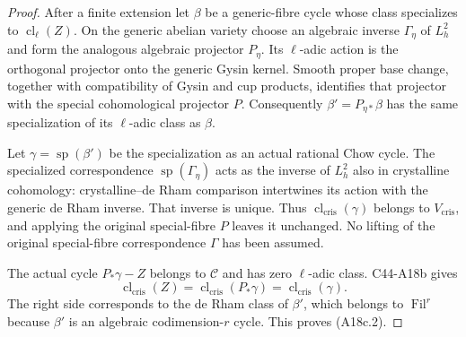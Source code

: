 \documentclass[11pt]{article}
\theoremstyle{remark}\newtheorem{remark}[theorem]{Remark}
\begin{document}
\begin{proof}
After a finite extension let $\beta$ be a generic-fibre cycle
whose class specializes to $\operatorname{cl}_\ell(Z)$.
On the generic abelian variety choose an algebraic inverse
$\Gamma_\eta$ of $L_h^2$ and form the analogous algebraic
projector $P_\eta$. Its $\ell$-adic action is the orthogonal
projector onto the generic Gysin kernel. Smooth proper base
change, together with compatibility of Gysin and cup products,
identifies that projector with the special cohomological
projector $P$. Consequently $\beta'=P_{\eta*}\beta$ has the
same specialization of its $\ell$-adic class as $\beta$.

Let $\gamma=\operatorname{sp}(\beta')$ be the specialization
as an actual rational Chow cycle. The specialized correspondence
$\operatorname{sp}(\Gamma_\eta)$ acts as the inverse of $L_h^2$
also in crystalline cohomology: crystalline--de Rham comparison
intertwines its action with the generic de Rham inverse.
That inverse is unique. Thus $\operatorname{cl}_{\mathrm{cris}}
(\gamma)$ belongs to $V_{\mathrm{cris}}$, and applying the
original special-fibre $P$ leaves it unchanged. No lifting of the
original special-fibre correspondence $\Gamma$ has been assumed.

The actual cycle $P_*\gamma-Z$ belongs to $\mathscr C$ and has
zero $\ell$-adic class. C44-A18b gives
\[
 \operatorname{cl}_{\mathrm{cris}}(Z)
   =\operatorname{cl}_{\mathrm{cris}}(P_*\gamma)
   =\operatorname{cl}_{\mathrm{cris}}(\gamma).
 \tag{A18c.3}
\]
The right side corresponds to the de Rham class of $\beta'$,
which belongs to $\operatorname{Fil}^r$ because $\beta'$ is an
algebraic codimension-$r$ cycle. This proves (A18c.2).


\end{proof}
\end{document}
